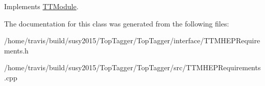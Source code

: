 Implements \hyperlink{classTTModule_a14e7c03fbf4ee1a5008c9344adc7c896}{T\-T\-Module}.



The documentation for this class was generated from the following files\-:\begin{DoxyCompactItemize}
\item 
/home/travis/build/susy2015/\-Top\-Tagger/\-Top\-Tagger/interface/T\-T\-M\-H\-E\-P\-Requirements.\-h\item 
/home/travis/build/susy2015/\-Top\-Tagger/\-Top\-Tagger/src/T\-T\-M\-H\-E\-P\-Requirements.\-cpp\end{DoxyCompactItemize}
